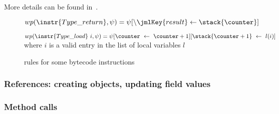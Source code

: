  More details can be found in~\cite{WPBC}.
\begin{figure}[ht]
$
wp(\instr{Type\_return} , \psi) = \psi[\backslash \jmlKey{result} \leftarrow \stack{\counter}]
$

$
wp(\instr{Type\_load} \ i, \psi) = \psi[\counter \ \leftarrow \ \counter+1] [\stack{\counter+1} \ \leftarrow \ l(i)]
$ where $i$ is a valid entry in the list of local variables $l$

\caption{rules for some bytecode instructions}
\label{instrWP}
\end{figure}

\subsubsection{References: creating objects, updating field values}


\subsubsection{Method calls}
